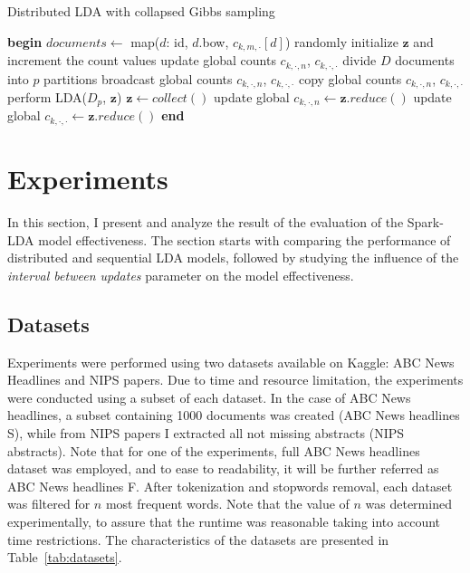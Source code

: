 \documentclass[journal]{IEEEtran}
\begin{document}
 \begin{algorithm}
\caption{Distributed LDA with collapsed Gibbs sampling}
\label{alg2}
\begin{algorithmic}
\scriptsize
\State \textbf{begin}
\State $documents \leftarrow $ map($d$: id, $d$.bow, $c_{k,m,\cdot}[d]$)
\State randomly initialize $\textbf{z}$ and increment the count values
\State update global counts $c_{k,\cdot,n}$, $c_{k,\cdot,\cdot}$
\State divide $D$ documents into $p$ partitions
   \State broadcast global counts $c_{k,\cdot,n}$, $c_{k,\cdot,\cdot}$
   	  \State copy global counts $c_{k,\cdot,n}$, $c_{k,\cdot,\cdot}$
   	  \State perform LDA($D_p$, $\textbf{z}$)
   \EndFor
   \State $\textbf{z} \leftarrow collect()$
   \State update global $c_{k,\cdot,n} \leftarrow\textbf{z}.reduce()$
   \State update global $c_{k,\cdot,\cdot} \leftarrow\textbf{z}.reduce()$
  \EndFor
\State \textbf{end}
\end{algorithmic}
\end{algorithm}


\section{Experiments}
\label{sec:exp}
In this section, I present and analyze the result of the evaluation of the Spark-LDA model effectiveness. The section starts with comparing the performance of distributed and sequential LDA models, followed by studying the influence of the \textit{interval between updates} parameter on the model effectiveness.

\subsection{Datasets}
Experiments were performed using two datasets available on Kaggle: ABC News Headlines and NIPS papers. Due to time and resource limitation, the experiments were  conducted using a subset of each dataset. In the case of ABC News headlines, a subset containing 1000 documents was created (ABC News headlines S), while from NIPS papers I extracted all not missing abstracts (NIPS abstracts). Note that for one of the experiments, full ABC News headlines dataset was employed, and to ease to readability, it will be further referred as ABC News headlines F. After tokenization and stopwords removal, each dataset was filtered for $n$ most frequent words. Note that the value of $n$ was determined experimentally, to assure that the runtime was reasonable taking into account time restrictions. The characteristics of the datasets are presented in Table~\ref{tab:datasets}.
\end{document}
